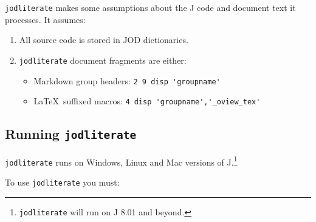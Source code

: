 \texttt{jodliterate} makes some assumptions about the J code and
document text it processes. It assumes:

\begin{enumerate}[1.]
\item
  All source code is stored in JOD dictionaries.
\item
  \texttt{jodliterate} document fragments are either:
  \begin{itemize}
  \item Markdown group headers: \verb|2 9 disp 'groupname'|
  \item \LaTeX\ suffixed macros: \verb|4 disp 'groupname','_oview_tex'|
  \end{itemize}


\end{enumerate}

\subsection{Running \texttt{jodliterate}}

\texttt{jodliterate} runs on Windows, Linux and Mac versions of
J.\footnote{\texttt{jodliterate} will run on J 8.01 and beyond.}

To use \texttt{jodliterate} you must:

